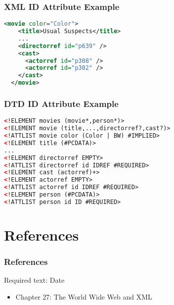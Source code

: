 \documentclass[dvipsnames]{beamer}
\theoremstyle{plain}
\begin{document}
\begin{frame}[fragile]
  \frametitle{XML ID Attribute Example}

  \begin{example}[Movies]
    \begin{lstlisting}[language=XML]
  <movie color="Color">
    <title>Usual Suspects</title>
    ...
    <directorref id="p639" />
    <cast>
      <actorref id="p308" />
      <actorref id="p302" />
    </cast>
  </movie>
    \end{lstlisting}
  \end{example}
\end{frame}

\begin{frame}[fragile]
  \frametitle{DTD ID Attribute Example}

  \begin{example}
    \begin{lstlisting}[language=XML]
<!ELEMENT movies (movie*,person*)>
<!ELEMENT movie (title,...,directorref?,cast?)>
<!ATTLIST movie color (Color | BW) #IMPLIED>
<!ELEMENT title (#PCDATA)>
...
<!ELEMENT directorref EMPTY>
<!ATTLIST directorref id IDREF #REQUIRED>
<!ELEMENT cast (actorref)+>
<!ELEMENT actorref EMPTY>
<!ATTLIST actorref id IDREF #REQUIRED>
<!ELEMENT person (#PCDATA)>
<!ATTLIST person id ID #REQUIRED>
    \end{lstlisting}
  \end{example}
\end{frame}

\section*{References}

\begin{frame}
  \frametitle{References}

  \begin{block}{Required text: Date}
    \begin{itemize}
      \item Chapter 27: \alert{The World Wide Web and XML}
    \end{itemize}
  \end{block}
\end{frame}
\end{document}
